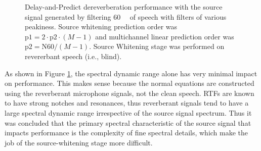 \begin{figure}[H]
	\vspace{1em}
	
	\label{subfig:params_source_spectrum_shaped_compare:C}
	
	\caption{Delay-and-Predict dereverberation performance with the source signal generated by filtering \qty{60}{\milli\sec} of speech with filters of various peakiness. Source whitening prediction order was $\mathrm{p1} = 2 \cdot \mathrm{p2} \cdot (M-1)$ and multichannel linear prediction order was $\mathrm{p2} = \mathrm{N60} / (M-1)$. Source Whitening stage was performed on revererbant speech (i.e., blind).}
	\label{fig:params_source_spectrum_shaped_compare}
	
\end{figure}

As shown in Figure \ref{fig:params_source_spectrum_shaped_compare}, the spectral dynamic range alone has very minimal impact on performance. This makes sense because the normal equations are constructed using the reverberant microphone signals, not the clean speech. RTFs are known to have strong notches and resonances, thus reverberant signals tend to have a large spectral dynamic range irrespective of the source signal spectrum. Thus it was concluded that the primary spectral characteristic of the source signal that impacts performance is the complexity of fine spectral details, which make the job of the source-whitening stage more difficult.



